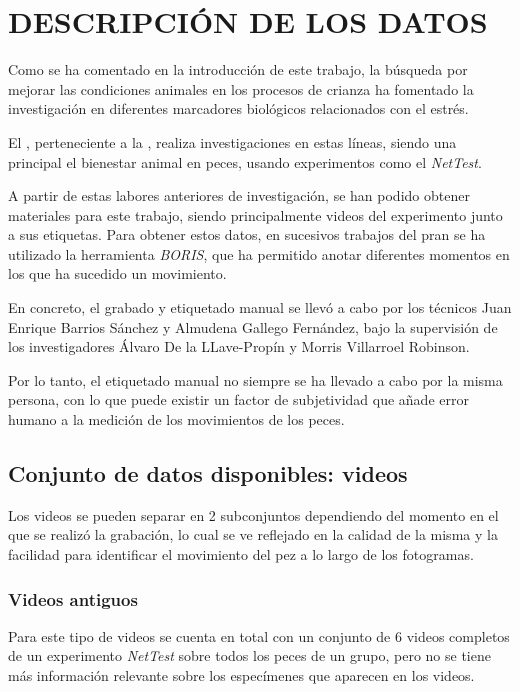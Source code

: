 \section{DESCRIPCIÓN DE LOS DATOS}

Como se ha comentado en la introducción de este trabajo, la búsqueda por mejorar las condiciones animales en los procesos de crianza ha fomentado la investigación en 
diferentes marcadores biológicos relacionados con el estrés.

El \cite{ObservatorioUPM}, perteneciente a la , realiza investigaciones en estas líneas, siendo una principal el bienestar animal en peces, 
usando experimentos como el \textit{NetTest}.

A partir de estas labores anteriores de investigación, se han podido obtener materiales para este trabajo, siendo principalmente videos del experimento junto a sus etiquetas. Para obtener 
estos datos, en sucesivos trabajos del \acrshort{pran} se ha utilizado la herramienta \textit{BORIS}\cite{friardBORISFreeVersatile2016}, que ha permitido anotar diferentes momentos en los que 
ha sucedido un movimiento.

En concreto, el grabado y etiquetado manual se llevó a cabo por los técnicos Juan Enrique Barrios Sánchez\cite{barriossanchezPruebaRedEvaluando2023}  y Almudena Gallego Fernández, bajo la supervisión de los investigadores 
Álvaro De la LLave-Propín y Morris Villarroel Robinson.

Por lo tanto, el etiquetado manual no siempre se ha llevado a cabo por la misma persona, con lo que puede existir un factor de subjetividad que añade error humano a la medición de los 
movimientos de los peces.

\subsection{Conjunto de datos disponibles: videos}

Los videos se pueden separar en 2 subconjuntos dependiendo del momento en el que se realizó la grabación, lo cual se ve reflejado en la calidad de la misma y la facilidad para identificar el movimiento 
del pez a lo largo de los fotogramas.

\subsubsection{Videos antiguos}

Para este tipo de videos se cuenta en total con un conjunto de 6 videos completos de un experimento \textit{NetTest} sobre todos los peces de un grupo, pero no se tiene más información relevante sobre 
los especímenes que aparecen en los videos.

